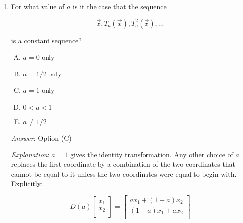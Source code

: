 \documentclass[10pt]{amsart}
\begin{document}
\begin{enumerate}
  \begin{enumerate}[(A)]
  \item $a = 0$ only
  \item $a = 1/2$ only
  \item $a = 1$ only
  \item $0 < a < 1$
  \item $a \ne 1/2$
  \end{enumerate}

  {\em Answer}: Option (A)

  {\em Explanation}: In this case, applying $T_a$ interchanges the
  coordinates. A second application interchanges them back. The
  sequence thus cycles between the vector $\vec{x}$ and the vector
  obtained by interchanging its coordinates.

  The failure of the remaining options will become clear from the
  answers to the rest of the questions.

  {\em Performance review}: 16 out of 22 got this. 2 chose (B), 1 each
  chose (C), (D), and (E). 1 left the question blank.

  {\em Historical note (last time)}: $7$ out of $24$ got this. $11$ chose (B),
  $4$ chose (C), $1$ each chose (D) and (E).


\item For what value of $a$ is it the case that the sequence

  $$\vec{x}, T_a(\vec{x}), T_a^2(\vec{x}), \dots$$

  is a constant sequence?

  \begin{enumerate}[(A)]
  \item $a = 0$ only
  \item $a = 1/2$ only
  \item $a = 1$ only
  \item $0 < a < 1$
  \item $a \ne 1/2$
  \end{enumerate}

  {\em Answer}: Option (C)

  {\em Explanation}: $a = 1$ gives the identity transformation. Any
  other choice of $a$ replaces the first coordinate by a combination
  of the two coordinates that cannot be equal to it unless the two
  coordinates were equal to begin with. Explicitly:

  $$D(a)\left[\begin{matrix} x_1 \\ x_2 \\\end{matrix}\right] = \left[ \begin{matrix}ax_1 + (1 - a)x_2 \\ (1 - a)x_1 + ax_2 \\\end{matrix}\right]$$


\end{enumerate}
\end{document}
